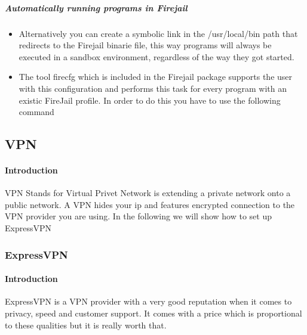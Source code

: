 \documentclass[a4paper,10pt]{article}
\begin{document}
\subparagraph{Automatically running programs in Firejail}

\begin{itemize}[leftmargin=*]
\item Alternatively you can create a symbolic link in the /usr/local/bin path that redirects to the Firejail binarie file, this way programs will always be executed in a sandbox environment, regardless of the way they got started.
\item The tool firecfg which is included in the Firejail package supports the user with this configuration and performs this task for every program with an existic FireJail profile. In order to do this you have to use the following command


\end{itemize}




\subsection{VPN}
\paragraph{Introduction}
VPN Stands for Virtual Privet Network is extending a private network onto a public network. A VPN hides your ip and features encrypted connection to the VPN provider you are using. In the following we will show how to set up ExpressVPN

\subsubsection{ExpressVPN}
\paragraph{Introduction}
ExpressVPN is a VPN provider with a very good reputation when it comes to privacy, speed and customer support. It comes with a price which is proportional to these qualities but it is really worth that.
\end{document}
